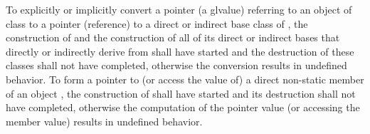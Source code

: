 \pnum
{}%
%
To explicitly or implicitly convert a pointer (a glvalue) referring to
an object of class
to a pointer (reference) to a direct or indirect base class
of
,
the construction of
and the construction of all of its direct or indirect bases that directly or
indirectly derive from
shall have started and the destruction of these classes shall not have
completed, otherwise the conversion results in undefined behavior.
%
%
%
%
%
To form a pointer to (or access the value of) a direct non-static member of
an object
,
the construction of
shall have started and its destruction shall not have completed,
otherwise the computation of the pointer value (or accessing the member
value) results in undefined behavior.
%
%
%
%
%
